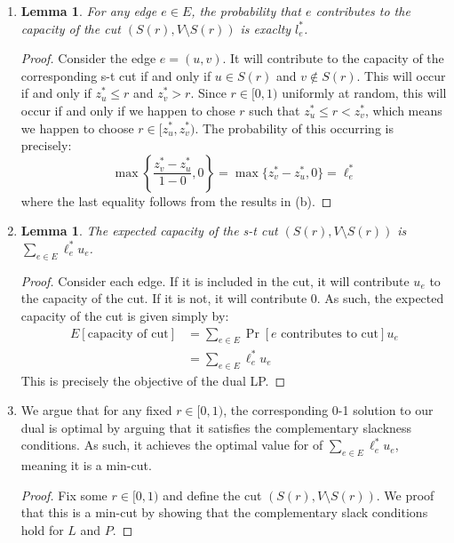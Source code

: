 \documentclass[12pt]{exam}
\newtheorem{lemma}[theorem]{Lemma}
\begin{document}
\begin{questions}
\begin{solution}
\begin{enumerate}[label=(\alph*)]
\begin{proof}
    \end{proof}
    It is clear that $A = S(r), B = V \setminus S(r)$ is a partition. As argued above, $s \in A$ and $t \in B$. As such, this define an s-t cut.
  \item
    \begin{lemma}
      For any edge $e \in E$, the probability that $e$ contributes to the capacity of the cut $(S(r), V \setminus S(r))$ is exaclty $l^*_e$.
    \end{lemma}
    \begin{proof}
      Consider the edge $e = (u,v)$. It will contribute to the capacity of the corresponding s-t cut if and only if $u \in S(r)$ and $v \notin S(r)$. This will occur if and only if $z^*_u \leq r$ and $z^*_v > r$. Since $r \in [0,1)$ uniformly at random, this will occur if and only if we happen to chose $r$ such that $z^*_u \leq r < z^*_v$, which means we happen to choose $r \in [z^*_u, z^*_v)$. The probability of this occurring is precisely:
      \[
        \max\left\{\frac{z^*_v - z^*_u}{1 - 0}, 0\right\} = \max\{ z^*_v - z^*_u, 0\} = \ell^*_e
      \]
      where the last equality follows from the results in (b).
    \end{proof}
  \item
    \begin{lemma}
      The expected capacity of the s-t cut $(S(r), V \setminus S(r))$ is $\sum_{e \in E} \ell^*_e u_e$.
    \end{lemma}
    \begin{proof}
      Consider each edge. If it is included in the cut, it will contribute $u_e$ to the capacity of the cut. If it is not, it will contribute $0$. As such, the expected capacity of the cut is given simply by:
      \begin{align*}
        E[\text{capacity of cut}] &= \sum_{e \in E} \Pr[e \text{ contributes to cut}] u_e \\
        &= \sum_{e \in E} \ell^*_e u_e \tag{By results from (d)}
      \end{align*}
      This is precisely the objective of the dual LP.
    \end{proof}
  \item 
    We argue that for any fixed $r \in [0, 1)$, the corresponding 0-1 solution to our dual is optimal by arguing that it satisfies the complementary slackness conditions. As such, it achieves the optimal value for of $\sum_{e\in E} \ell_e^*u_e$, meaning it is a min-cut.
    \begin{proof}
      Fix some $r \in [0,1)$ and define the cut $(S(r), V \setminus S(r))$. We proof that this is a min-cut by showing that the complementary slack conditions hold for $L$ and $P$. 


\end{proof}
\end{enumerate}
\end{solution}
\end{questions}
\end{document}
